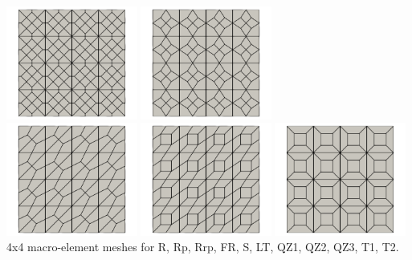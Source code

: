 \documentclass[a4paper,12pt]{article}
\begin{document}
\begin{center}
\includegraphics[width=4.3cm]{../images/4x4/topos.0003.png}
\includegraphics[width=4.3cm]{../images/4x4/topos.0004.png}\\
\includegraphics[width=4.3cm]{../images/4x4/topos.0005.png}
\includegraphics[width=4.3cm]{../images/4x4/topos.0006.png}
\includegraphics[width=4.3cm]{../images/4x4/topos.0007.png}\\
4x4 macro-element meshes for R, Rp, Rrp, FR, S, LT, QZ1, QZ2, QZ3, T1, T2.
\end{center}
\end{document}

